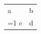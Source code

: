 \documentclass{article}
\def\x{1}
\begin{document}
\begin{tabular}{ll}
\toprule
a & b\\
\ifnum\x=1\cmidrule{1-2}\fi
c & d\\
\bottomrule
\end{tabular}
\end{document}
